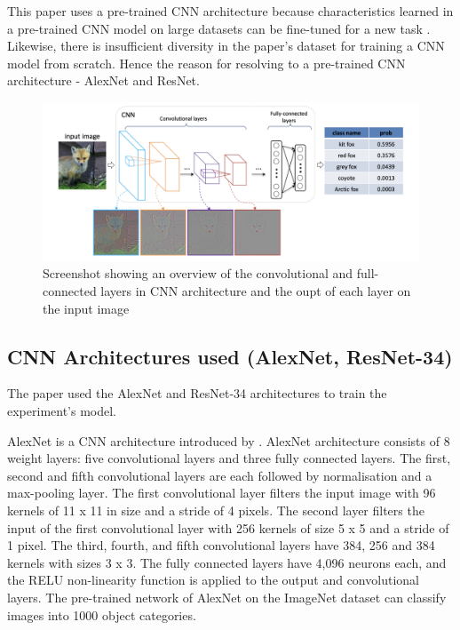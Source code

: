 \documentclass[conference]{IEEEtran}
\begin{document}
This paper uses a pre-trained CNN architecture because characteristics learned in a pre-trained CNN model on large datasets can be fine-tuned for a new task \cite{zhuang2020comprehensive}. Likewise, there is insufficient diversity in the paper's dataset for training a CNN model from scratch. Hence the reason for resolving to a pre-trained CNN architecture - AlexNet and ResNet. 


    \begin{figure}[htbp]
        \centerline{\includegraphics[scale=0.25]{figures/Screenshot 2021-11-24 at 14.35.12.png}}
        \caption{Screenshot showing an overview of the convolutional and full-connected layers in CNN architecture and the oupt of each layer on the input image \cite{soderkvist2001computer}}

        \label{fig:train_gate}
    \end{figure}
    

\subsection{CNN Architectures used (AlexNet, ResNet-34)}
The paper used the AlexNet and ResNet-34 architectures to train the experiment's model.

AlexNet is a CNN architecture introduced by \cite{krizhevsky2012imagenet}. AlexNet architecture consists of 8 weight layers: five convolutional layers and three fully connected layers. The first, second and fifth convolutional layers are each followed by normalisation and a max-pooling layer. The first convolutional layer filters the input image with 96 kernels of 11 x 11 in size and a stride of 4 pixels. The second layer filters the input of the first convolutional layer with 256 kernels of size 5 x 5 and a stride of 1 pixel. The third, fourth, and fifth convolutional layers have 384, 256 and 384 kernels with sizes 3 x 3. The fully connected layers have 4,096 neurons each, and the RELU non-linearity function is applied to the output and convolutional layers.
The pre-trained network of AlexNet on the ImageNet dataset can classify images into 1000 object categories.
\end{document}
